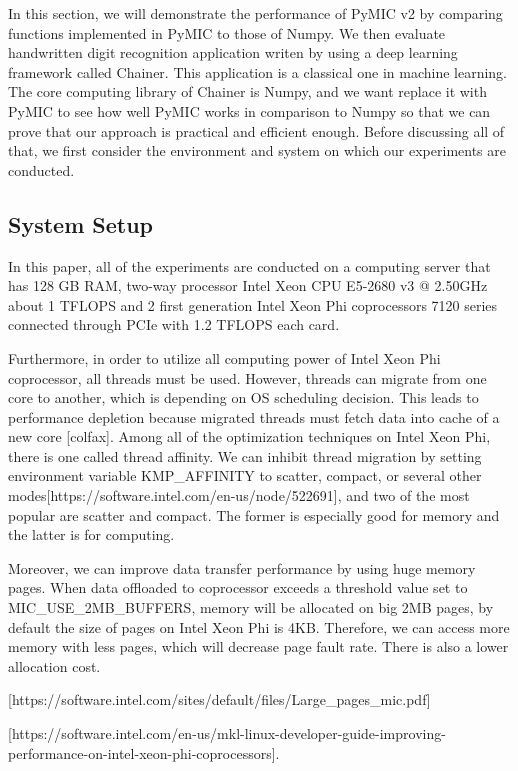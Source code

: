 In this section, we will demonstrate the performance of PyMIC v2 by comparing functions implemented in PyMIC to those of Numpy. We then evaluate handwritten digit recognition application writen by using a deep learning framework called Chainer. This application is a classical one in machine learning. The core computing library of Chainer is Numpy, and we want replace it with PyMIC to see how well PyMIC works in comparison to Numpy so that we can prove that our approach is practical and efficient enough. Before discussing all of that, we first consider the environment and system on which our experiments are conducted.

\subsection{System Setup}
In this paper, all of the experiments are conducted on a computing server that has 128 GB RAM, two-way processor Intel Xeon CPU E5-2680 v3 @ 2.50GHz about 1 TFLOPS and 2 first generation Intel Xeon Phi coprocessors 7120 series connected through PCIe with 1.2 TFLOPS each card.

Furthermore, in order to utilize all computing power of Intel Xeon Phi coprocessor, all threads must be used. However, threads can migrate from one core to another, which is depending on OS scheduling decision. This leads to performance depletion because migrated threads must fetch data into cache of a new core [colfax]. Among all of the optimization techniques on Intel Xeon Phi, there is one called thread affinity. We can inhibit thread migration by setting environment variable KMP\_AFFINITY to scatter, compact, or several other modes[https://software.intel.com/en-us/node/522691], and two of the most popular are scatter and compact. The former is especially good for memory and the latter is for computing.

Moreover, we can improve data transfer performance by using huge memory pages. When data offloaded to coprocessor exceeds a threshold value set to MIC\_USE\_2MB\_BUFFERS, memory will be allocated on big 2MB pages, by default the size of pages on Intel Xeon Phi is 4KB. Therefore, we can access more memory with less pages, which will decrease page fault rate. There is also a lower allocation cost.

[https://software.intel.com/sites/default/files/Large\_pages\_mic.pdf]


[https://software.intel.com/en-us/mkl-linux-developer-guide-improving-performance-on-intel-xeon-phi-coprocessors].


